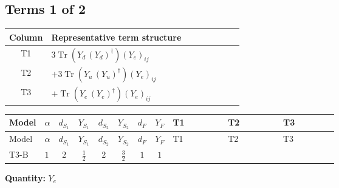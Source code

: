 \documentclass[8pt]{article}
\begin{document}
\begin{landscape}
\subsection*{Terms 1 of 2}
\begin{center}
\begin{tabular}{@{}c >{\raggedright\arraybackslash}p{0.82\linewidth}@{}}
\toprule
Column & Representative term structure \\
\midrule
T1 & \(\displaystyle 3 \operatorname{Tr}\!\left({Y_d}\,\left({Y_d}\right)^{\dagger}\right) \left({Y_e}\right)_{ij}\) \\
\midrule
T2 & \(\displaystyle +3 \operatorname{Tr}\!\left({Y_u}\,\left({Y_u}\right)^{\dagger}\right) \left({Y_e}\right)_{ij}\) \\
\midrule
T3 & \(\displaystyle +\operatorname{Tr}\!\left({Y_e}\,\left({Y_e}\right)^{\dagger}\right) \left({Y_e}\right)_{ij}\) \\
\midrule
\bottomrule
\end{tabular}
\end{center}
\smallskip
\tiny
\begin{longtable}{@{}llcccccc >{\raggedright\arraybackslash}p{0.21\linewidth} >{\raggedright\arraybackslash}p{0.21\linewidth} >{\raggedright\arraybackslash}p{0.21\linewidth}@{}}
\toprule
Model & $\alpha$ & $d_{S_1}$ & $Y_{S_1}$ & $d_{S_2}$ & $Y_{S_2}$ & $d_F$ & $Y_F$ & T1 & T2 & T3 \\
\midrule
\endfirsthead
\toprule
Model & $\alpha$ & $d_{S_1}$ & $Y_{S_1}$ & $d_{S_2}$ & $Y_{S_2}$ & $d_F$ & $Y_F$ & T1 & T2 & T3 \\
\midrule
\endhead
T3-B & $1$ & $2$ & $\frac{1}{2}$ & $2$ & $\frac{3}{2}$ & $1$ & $1$ & \scriptsize\adjustbox{max width=\linewidth}{$\begin{gathered} 3 \operatorname{Tr}\!\left({Y_d}\,\left({Y_d}\right)^{\dagger}\right) \left({Y_e}\right)_{ij}\end{gathered}$} & \scriptsize\adjustbox{max width=\linewidth}{$\begin{gathered} +3 \operatorname{Tr}\!\left({Y_u}\,\left({Y_u}\right)^{\dagger}\right) \left({Y_e}\right)_{ij}\end{gathered}$} & \scriptsize\adjustbox{max width=\linewidth}{$\begin{gathered} +\operatorname{Tr}\!\left({Y_e}\,\left({Y_e}\right)^{\dagger}\right) \left({Y_e}\right)_{ij}\end{gathered}$} \\
\midrule
\bottomrule
\end{longtable}
\clearpage
\noindent\textbf{Quantity: }$Y_e$\par\smallskip

\end{landscape}
\end{document}
